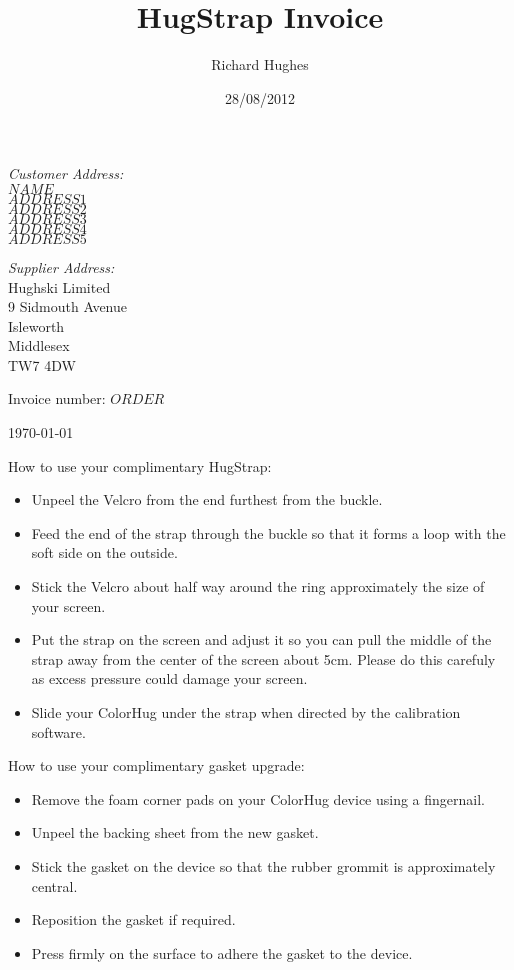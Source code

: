 \documentclass[a4paper,10pt,oneside]{letter}
\author{Richard Hughes}
\title{HugStrap Invoice}
\date{28/08/2012}
\begin{document}
\large
\renewcommand{\arraystretch}{1.5}

\begin{minipage}[t]{4in}
\textit{Customer Address:}\\
$NAME$\\
$ADDRESS1$\\
$ADDRESS2$\\
$ADDRESS3$\\
$ADDRESS4$\\
$ADDRESS5$\\
\end{minipage}
\begin{minipage}[t]{2in}
\textit{Supplier Address:}\\
Hughski Limited\\
9 Sidmouth Avenue\\
Isleworth\\
Middlesex\\
TW7 4DW
\end{minipage}

Invoice number: \texttt{$ORDER$}\\

\begin{flushright}
 \today
\end{flushright}

How to use your complimentary HugStrap:

\begin{itemize}
\item Unpeel the Velcro from the end furthest from the buckle.
\item Feed the end of the strap through the buckle so that it forms a loop with the soft side on the outside.
\item Stick the Velcro about half way around the ring approximately the size of your screen.
\item Put the strap on the screen and adjust it so you can pull the middle of the strap away from the center of the screen about 5cm. Please do this carefuly as excess pressure could damage your screen.
\item Slide your ColorHug under the strap when directed by the calibration software.
\end{itemize}

How to use your complimentary gasket upgrade:

\begin{itemize}
\item Remove the foam corner pads on your ColorHug device using a fingernail.
\item Unpeel the backing sheet from the new gasket.
\item Stick the gasket on the device so that the rubber grommit is approximately central.
\item Reposition the gasket if required.
\item Press firmly on the surface to adhere the gasket to the device.
\end{itemize}
\end{document}
